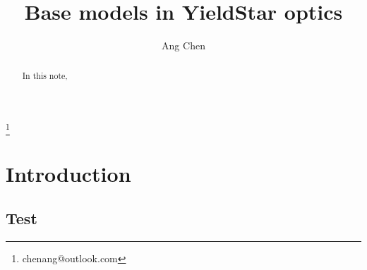 \documentclass[pra,superscriptaddress,reprint]{revtex4-1}
\begin{document}
\title{\Large Base models in YieldStar optics}

\author{Ang Chen}
\thanks{chenang@outlook.com}


\begin{abstract}
In this note,
\end{abstract}

\maketitle

\section{Introduction~\label{sec:1}}
\subsection{Test}





\end{document}
